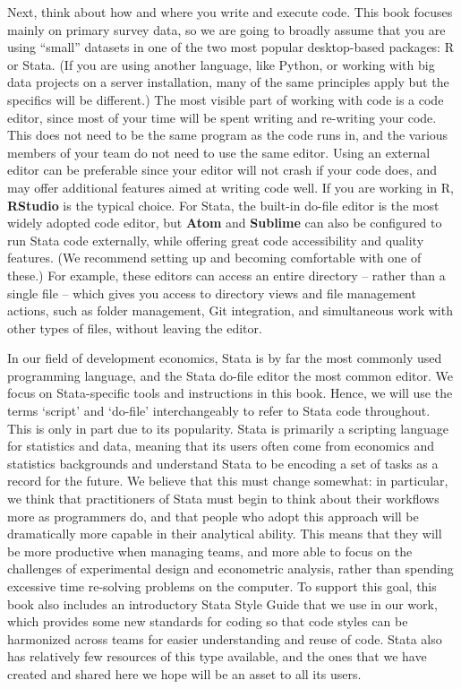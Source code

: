 Next, think about how and where you write and execute code.
This book focuses mainly on primary survey data,
so we are going to broadly assume that you are using ``small'' datasets
in one of the two most popular desktop-based packages: R or Stata.
(If you are using another language, like Python,
or working with big data projects on a server installation,
many of the same principles apply but the specifics will be different.)
The most visible part of working with code is a code editor,
since most of your time will be spent writing and re-writing your code.
This does not need to be the same program as the code runs in,
and the various members of your team do not need to use the same editor.
Using an external editor can be preferable since your editor will not crash if your code does,
and may offer additional features aimed at writing code well.
If you are working in R, \textbf{RStudio} is the typical choice.
For Stata, the built-in do-file editor is the most widely adopted code editor,
but \textbf{Atom} and
\textbf{Sublime}
can also be configured to run Stata code externally,
while offering great code accessibility and quality features.
(We recommend setting up and becoming comfortable with one of these.)
For example, these editors can access an entire directory -- rather than a single file --
which gives you access to directory views and file management actions,
such as folder management, Git integration,
and simultaneous work with other types of files, without leaving the editor.

In our field of development economics,
Stata is by far the most commonly used programming language,
and the Stata do-file editor the most common editor.
We focus on Stata-specific tools and instructions in this book.
Hence, we will use the terms `script' and `do-file'
interchangeably to refer to Stata code throughout.
This is only in part due to its popularity.
Stata is primarily a scripting language for statistics and data,
meaning that its users often come from economics and statistics backgrounds
and understand Stata to be encoding a set of tasks as a record for the future.
We believe that this must change somewhat:
in particular, we think that practitioners of Stata
must begin to think about their workflows more as programmers do,
and that people who adopt this approach will be dramatically
more capable in their analytical ability.
This means that they will be more productive when managing teams,
and more able to focus on the challenges of experimental design
and econometric analysis, rather than spending excessive time
re-solving problems on the computer.
To support this goal, this book also includes
an introductory Stata Style Guide
that we use in our work, which provides
some new standards for coding so that code styles
can be harmonized across teams for easier understanding and reuse of code.
Stata also has relatively few resources of this type available,
and the ones that we have created and shared here
we hope will be an asset to all its users.

